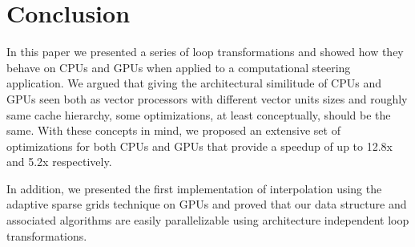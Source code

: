 \section{Conclusion}

In this paper we presented a series of loop transformations and showed
how they behave on CPUs and GPUs when applied to a computational steering
application. We argued that giving the architectural similitude of CPUs and GPUs
seen both as vector processors with different vector units sizes and roughly
same cache hierarchy, some optimizations, at least conceptually, should be the
same. With these concepts in mind, we proposed an extensive set of optimizations
for both CPUs and GPUs that provide a speedup of up to 12.8x and 5.2x
respectively.

In addition, we presented the first implementation of interpolation
using the adaptive sparse grids technique on GPUs and proved that our data
structure and associated algorithms are easily parallelizable using architecture
independent loop transformations.


